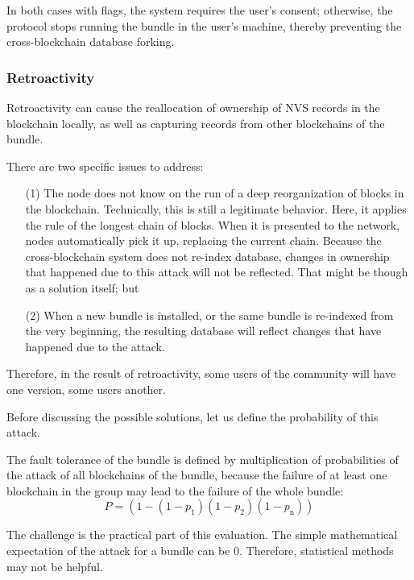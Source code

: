 \begin{multicols}{2}
In both cases with flags, the system requires the user’s consent; otherwise, the protocol stops running the bundle in the user’s machine, thereby preventing the cross-blockchain database forking.

\vspace{-.5cm}

\subsubsection{Retroactivity}\label{subsubsec-4.3.e}

\vspace{-.3cm}

Retroactivity can cause the reallocation of ownership of NVS records in the blockchain locally, as well as capturing records from other blockchains of the bundle.

There are two specific issues to address:
\begin{itemize}
\item[(1)] The node does not know on the run of a deep reorganization of blocks in the blockchain. Technically, this is still a legitimate behavior. Here, it applies the rule of the longest chain of blocks. When it is presented to the network, nodes automatically pick it up, replacing the current chain. Because the cross-blockchain system does not re-index database, changes in ownership that happened due to this attack will not be reflected. That might be though as a solution itself; but
\item[(2)] When a new bundle is installed, or the same bundle is re-indexed from the very beginning, the resulting database will reflect changes that have happened due to the attack.
\end{itemize}

Therefore, in the result of retroactivity, some users of the community will have one version, some users another.

Before discussing the possible solutions, let us define the probability of this attack.

The fault tolerance of the bundle is defined by multiplication of probabilities of the attack of all blockchains of the bundle, because the failure of at least one blockchain in the group may lead to the failure of the whole bundle:
\begin{equation}
P=(1-(1-p_{1})(1-p_{2})(1-p_{\text{n}}))\label{equ1}
\end{equation}

The challenge is the practical part of this evaluation. The simple mathematical expectation of the attack for a bundle can be 0. Therefore, statistical methods may not be helpful.


\end{multicols}
